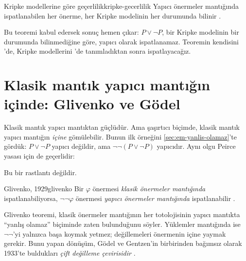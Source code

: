 \begin{teorem}{Kripke modellerine göre geçerlilik}{kripke-gecerlilik}
Yapıcı önermeler mantığında ispatlanabilen her önerme, her Kripke
modelinin her durumunda bilinir \citep{kripke1965}.
\end{teorem}

Bu teoremi kabul edersek sonuç hemen çıkar: $P \vee \neg P$, bir Kripke
modelinin bir durumunda bilinmediğine göre, yapıcı olarak
ispatlanamaz. Teoremin kendisini 'de, Kripke modellerini
\Lean{}'de tanımladıktan sonra ispatlayacağız.

\section{Klasik mantık yapıcı mantığın içinde: Glivenko ve Gödel}\label{sec:glivenko}

Klasik mantık yapıcı mantıktan güçlüdür. Ama şaşırtıcı biçimde, klasik
mantık yapıcı mantığın \emph{içine} gömülebilir. Bunun ilk örneğini
\cref{sec:em-yanlis-olamaz}'te gördük: $P \vee \neg P$ yapıcı
değildir, ama $\neg\neg(P \vee \neg P)$ yapıcıdır. Aynı olgu Peirce
yasası için de geçerlidir:


\noindent Bu bir rastlantı değildir.

\begin{teorem}{Glivenko, 1929}{glivenko}
Bir $\varphi$ önermesi \emph{klasik önermeler mantığında}
ispatlanabiliyorsa, $\neg\neg\varphi$ önermesi \emph{yapıcı önermeler
mantığında} ispatlanabilir \citep{glivenko1929}.
\end{teorem}

Glivenko teoremi, klasik önermeler mantığının her totolojisinin yapıcı
mantıkta ``yanlış olamaz'' biçiminde zaten bulunduğunu söyler. Yüklemler
mantığında ise $\neg\neg$'yi yalnızca başa koymak yetmez; değillemeleri
önermenin içine yaymak gerekir. Bunu yapan dönüşüm, Gödel ve Gentzen'in
birbirinden bağımsız olarak 1933'te buldukları \emph{çift değilleme
çevirisidir} \citep{godel1933, gentzen1936}.

